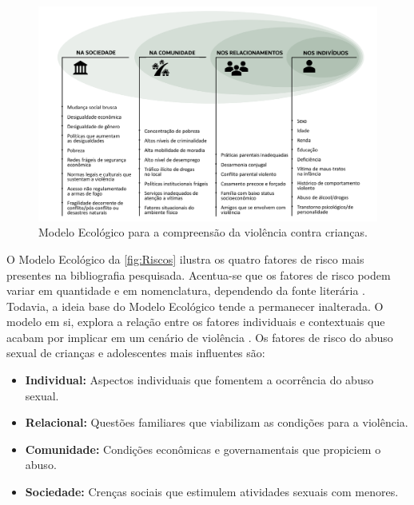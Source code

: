 \begin{figure}[htb]

    \caption{\label{fig:Riscos}Modelo Ecológico para a compreensão da violência contra crianças.}
    \hspace{-2.8cm}
      \includegraphics[width=1.28\linewidth]{./Visuais/Ecologico.pdf}
  
  \end{figure}

O Modelo Ecológico da \autoref{fig:Riscos} ilustra os quatro fatores de risco mais presentes na bibliografia pesquisada. Acentua-se que os fatores de risco podem variar em quantidade e em nomenclatura, dependendo da fonte literária \cite{centers2004sexual, sexual2017department, blasco2018abuso, UNICEF2016promising}. Todavia, a ideia base do Modelo Ecológico tende a permanecer inalterada. O modelo em si, explora a relação entre os fatores individuais e contextuais que acabam por implicar em um cenário de violência \cite{dahlberg2006violencia}. Os fatores de risco do abuso sexual de crianças e adolescentes mais influentes são:

\begin{itemize}
    \item \textbf{Individual:} \hfill Aspectos individuais que fomentem a ocorrência do abuso sexual. %
    \item \textbf{Relacional:} \hfill Questões familiares que viabilizam as condições para a violência.  %
    \item \textbf{Comunidade:} \hfill Condições econômicas e governamentais que propiciem o abuso.
    \item \textbf{Sociedade:} \hfill Crenças sociais que estimulem atividades sexuais com menores. 
\end{itemize}

